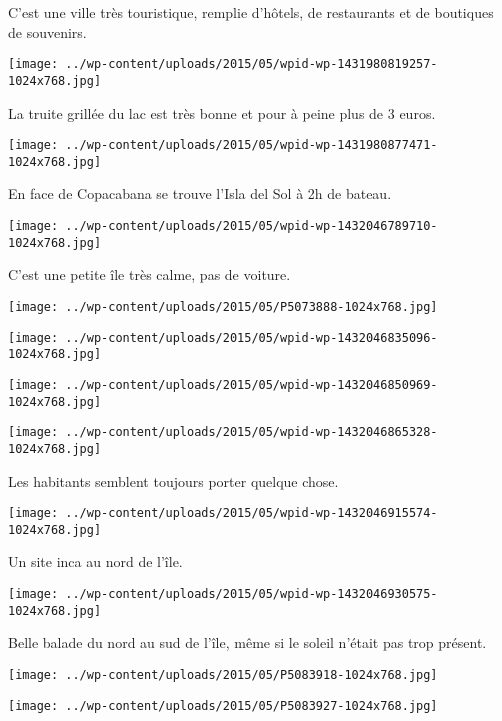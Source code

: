 C'est une ville très touristique, remplie d'hôtels, de restaurants et de boutiques de souvenirs. 
\begin{center} \texttt{[image: ../wp-content/uploads/2015/05/wpid-wp-1431980819257-1024x768.jpg]} \end{center}
\pagebreak

La truite grillée du lac est très bonne et pour à peine plus de 3 euros. 
\begin{center} \texttt{[image: ../wp-content/uploads/2015/05/wpid-wp-1431980877471-1024x768.jpg]} \end{center}

En face de Copacabana se trouve l'Isla del Sol à 2h de bateau. 
\begin{center} \texttt{[image: ../wp-content/uploads/2015/05/wpid-wp-1432046789710-1024x768.jpg]} \end{center}
\pagebreak

C'est une petite île très calme, pas de voiture. 
\begin{center} \texttt{[image: ../wp-content/uploads/2015/05/P5073888-1024x768.jpg]} \end{center}
\begin{center} \texttt{[image: ../wp-content/uploads/2015/05/wpid-wp-1432046835096-1024x768.jpg]} \end{center}

\begin{center} \texttt{[image: ../wp-content/uploads/2015/05/wpid-wp-1432046850969-1024x768.jpg]} \end{center}
\begin{center} \texttt{[image: ../wp-content/uploads/2015/05/wpid-wp-1432046865328-1024x768.jpg]} \end{center}
\pagebreak

Les habitants semblent toujours porter quelque chose. 
\begin{center} \texttt{[image: ../wp-content/uploads/2015/05/wpid-wp-1432046915574-1024x768.jpg]} \end{center}

Un site inca au nord de l'île. 
\begin{center} \texttt{[image: ../wp-content/uploads/2015/05/wpid-wp-1432046930575-1024x768.jpg]} \end{center}
\pagebreak

Belle balade du nord au sud de l'île, même si le soleil n'était pas trop présent. 
\begin{center} \texttt{[image: ../wp-content/uploads/2015/05/P5083918-1024x768.jpg]} \end{center}
\begin{center} \texttt{[image: ../wp-content/uploads/2015/05/P5083927-1024x768.jpg]} \end{center}

